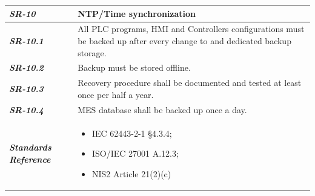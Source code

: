 \begin{tabularx}{\textwidth}{>{\bfseries}p{2.5cm} X}
    \textit{SR-10} & \textbf{NTP/Time synchronization} \vspace{0.5em}\\
\toprule
\textit{SR-10.1} &
    All PLC programs, HMI and Controllers configurations must be backed up after every change to and dedicated backup storage. 
    \vspace{0.5em}
\\
\textit{SR-10.2} &
    Backup must be stored offline.
    \vspace{0.5em}
\\
\textit{SR-10.3} &
    Recovery procedure shall be documented and tested at least once per half a year.
    \vspace{0.5em}
\\
\textit{SR-10.4} &
    MES database shall be backed up once a day.
    \vspace{0.5em}
\\
\midrule
    \textit{Standards Reference} &
\begin{itemize}[label=-, noitemsep, topsep=0pt, leftmargin=*]
    \item IEC 62443-2-1 §4.3.4; 
    \item ISO/IEC 27001 A.12.3; 
    \item NIS2 Article 21(2)(c)
\end{itemize} \vspace{1em} \\ 
\end{tabularx}
\vspace{2em}


